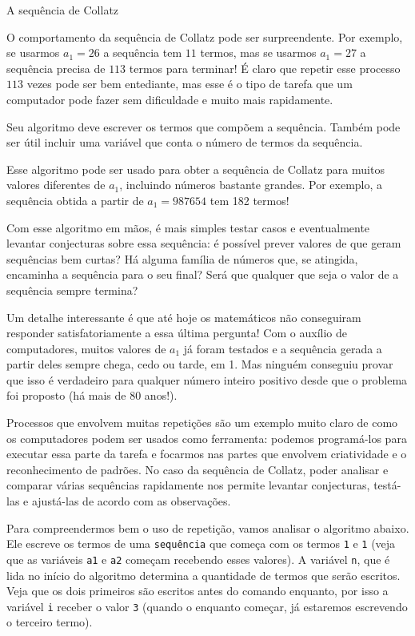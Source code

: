 \begin{task}{A sequência de Collatz}
\begin{enumerate}
O comportamento da sequência de Collatz pode ser surpreendente. Por exemplo, se usarmos $a_1=26$ a sequência tem $11$ termos, mas se usarmos $a_1=27$ a sequência precisa de $113$ termos para terminar! É claro que repetir esse processo $113$ vezes pode ser bem entediante, mas esse é o tipo de tarefa que um computador pode fazer sem dificuldade e muito mais rapidamente.

\end{enumerate}

\begin{observation}{}
Seu algoritmo deve escrever os termos que compõem a sequência. Também pode ser útil incluir uma variável que conta o número de termos da sequência.
\end{observation}
\end{task}

Esse algoritmo pode ser usado para obter a sequência de Collatz para muitos valores diferentes de $a_1$, incluindo números bastante grandes. Por exemplo, a sequência obtida a partir de $a_1=987654$ tem 182 termos!

Com esse algoritmo em mãos, é mais simples testar casos e eventualmente levantar conjecturas sobre essa sequência: é possível prever valores de  que geram sequências bem curtas? Há alguma família de números que, se atingida, encaminha a sequência para o seu final? Será que qualquer que seja o valor de  a sequência sempre termina?

Um detalhe interessante é que até hoje os matemáticos não conseguiram responder satisfatoriamente a essa última pergunta! Com o auxílio de computadores, muitos valores de $a_1$ já foram testados e a sequência gerada a partir deles sempre chega, cedo ou tarde, em 1. Mas ninguém conseguiu provar que isso é verdadeiro para qualquer número inteiro positivo desde que o problema foi proposto (há mais de 80 anos!).

\label{comp-arr5}

Processos que envolvem muitas repetições são um exemplo muito claro de como os computadores podem ser usados como ferramenta: podemos programá-los para executar essa parte da tarefa e focarmos nas partes que envolvem criatividade e o reconhecimento de padrões. No caso da sequência de Collatz, poder analisar e comparar várias sequências rapidamente nos permite levantar conjecturas, testá-las e ajustá-las de acordo com as observações.

Para compreendermos bem o uso de repetição, vamos analisar o algoritmo abaixo. Ele escreve os termos de uma \verb|sequência| que começa com os termos \verb|1| e \verb|1| (veja que as variáveis \verb|a1| e \verb|a2| começam recebendo esses valores). A variável \verb|n|, que é lida no início do algoritmo determina a quantidade de termos que serão escritos. Veja que os dois primeiros são escritos antes do comando enquanto, por isso a variável \verb|i| receber o valor \verb|3| (quando o enquanto começar, já estaremos escrevendo o terceiro termo).

